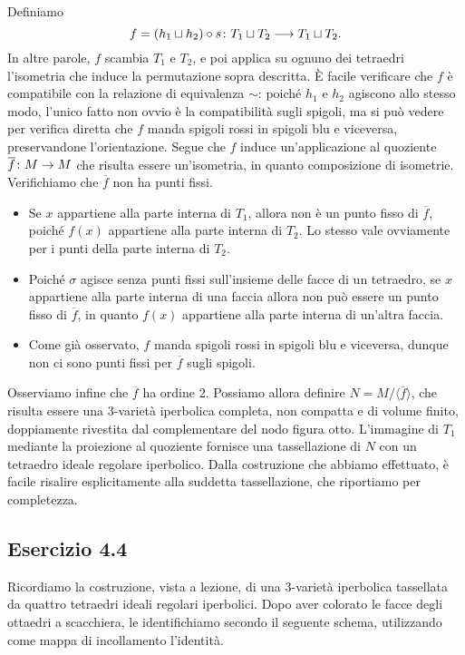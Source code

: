 Definiamo
\[
\map{f=(h_1\sqcup h_2)\circ s}{T_1\sqcup T_2}{T_1\sqcup T_2.}
\]
In altre parole, $f$ scambia $T_1$ e $T_2$, e poi applica su ognuno dei tetraedri l'isometria che induce la permutazione sopra descritta. È facile verificare che $f$ è compatibile con la relazione di equivalenza $\sim$: poiché $h_1$ e $h_2$ agiscono allo stesso modo, l'unico fatto non ovvio è la compatibilità sugli spigoli, ma si può vedere per verifica diretta che $f$ manda spigoli rossi in spigoli blu e viceversa, preservandone l'orientazione.
Segue che $f$ induce un'applicazione al quoziente $\map{\overline{f}}{M}{M}$ che risulta essere un'isometria, in quanto composizione di isometrie. Verifichiamo che $\overline{f}$ non ha punti fissi.
\begin{itemize}
\item Se $x$ appartiene alla parte interna di $T_1$, allora non è un punto fisso di $\overline{f}$, poiché $f(x)$ appartiene alla parte interna di $T_2$. Lo stesso vale ovviamente per i punti della parte interna di $T_2$.
\item Poiché $\sigma$ agisce senza punti fissi sull'insieme delle facce di un tetraedro, se $x$ appartiene alla parte interna di una faccia allora non può essere un punto fisso di $\overline{f}$, in quanto $f(x)$ appartiene alla parte interna di un'altra faccia.
\item Come già osservato, $f$ manda spigoli rossi in spigoli blu e viceversa, dunque non ci sono punti fissi per $\overline{f}$ sugli spigoli.
\end{itemize}
Osserviamo infine che $\overline{f}$ ha ordine $2$. Possiamo allora definire $N=M/\langle\overline{f}\rangle$, che risulta essere una $3$-varietà iperbolica completa, non compatta e di volume finito, doppiamente rivestita dal complementare del nodo figura otto. L'immagine di $T_1$ mediante la proiezione al quoziente fornisce una tassellazione di $N$ con un tetraedro ideale regolare iperbolico. Dalla costruzione che abbiamo effettuato, è facile risalire esplicitamente alla suddetta tassellazione, che riportiamo per completezza.

\newpage
\subsection*{Esercizio 4.4}
Ricordiamo la costruzione, vista a lezione, di una $3$-varietà iperbolica tassellata da quattro tetraedri ideali regolari iperbolici. Dopo aver colorato le facce degli ottaedri a scacchiera, le identifichiamo secondo il seguente schema, utilizzando come mappa di incollamento l'identità.

